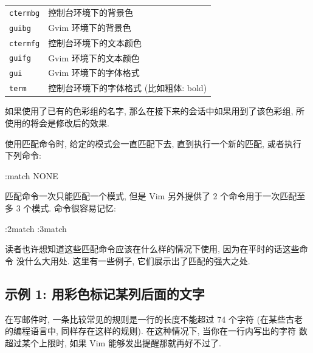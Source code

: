 \begin{center}
\begin{tabular}{ll}
    \hline
    \texttt{ctermbg}    & 控制台环境下的背景色 \\
    \texttt{guibg}      & Gvim 环境下的背景色 \\
    \texttt{ctermfg}     & 控制台环境下的文本颜色 \\
    \texttt{guifg}      & Gvim 环境下的文本颜色 \\
    \texttt{gui}        & Gvim 环境下的字体格式 \\
    \texttt{term}       & 控制台环境下的字体格式 (比如粗体: bold) \\
    \hline
\end{tabular}
\end{center}

如果使用了已有的色彩组的名字, 那么在接下来的会话中如果用到了该色彩组,
所使用的将会是修改后的效果.

使用匹配命令时, 给定的模式会一直匹配下去, 直到执行一个新的匹配, 或者执行
下列命令:
\begin{vimcmd}
:match NONE
\end{vimcmd}
匹配命令一次只能匹配一个模式, 但是 Vim 另外提供了 2 个命令用于一次匹配至
多 3 个模式. 命令很容易记忆:
\begin{vimcmd}
:2match
:3match
\end{vimcmd}
读者也许想知道这些匹配命令应该在什么样的情况下使用, 因为在平时的话这些命令
没什么大用处. 这里有一些例子, 它们展示出了匹配的强大之处.

\subsection{示例 1: 用彩色标记某列后面的文字}
\label{subsec:mark_color_characters_after_a_certain}
在写邮件时, 一条比较常见的规则是一行的长度不能超过 74 个字符 (在某些古老
的编程语言中, 同样存在这样的规则). 在这种情况下, 当你在一行内写出的字符
数超过某个上限时, 如果 Vim 能够发出提醒那就再好不过了.

